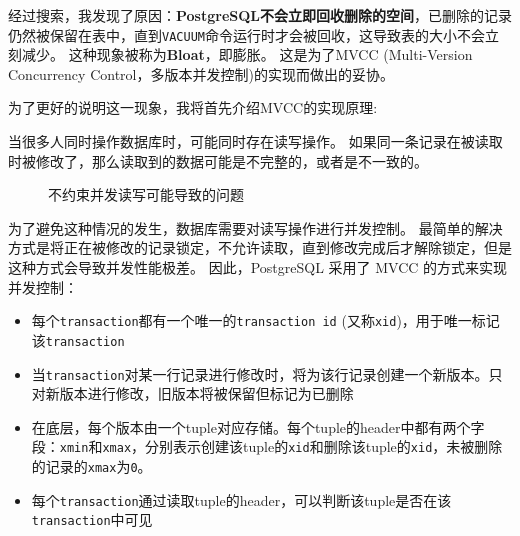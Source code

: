 \documentclass[a4paper,10pt]{ctexart}
\begin{document}
经过搜索，我发现了原因：\textbf{PostgreSQL不会立即回收删除的空间}，已删除的记录仍然被保留在表中，直到\texttt{VACUUM}命令运行时才会被回收，这导致表的大小不会立刻减少。
这种现象被称为\textbf{Bloat}，即膨胀。
这是为了MVCC (Multi-Version Concurrency Control，多版本并发控制)的实现而做出的妥协。

\vspace{0.7cm}
为了更好的说明这一现象，我将首先介绍MVCC的实现原理:

当很多人同时操作数据库时，可能同时存在读写操作。
如果同一条记录在被读取时被修改了，那么读取到的数据可能是不完整的，或者是不一致的。
\begin{figure}[H]
    \centering
    \caption{不约束并发读写可能导致的问题}
\end{figure}

为了避免这种情况的发生，数据库需要对读写操作进行并发控制。
最简单的解决方式是将正在被修改的记录锁定，不允许读取，直到修改完成后才解除锁定，但是这种方式会导致并发性能极差。
因此，PostgreSQL 采用了 MVCC 的方式来实现并发控制：
\begin{itemize}
    \item 每个\texttt{transaction}都有一个唯一的\texttt{transaction id} (又称\texttt{xid})，用于唯一标记该\texttt{transaction}
    \item 当\texttt{transaction}对某一行记录进行修改时，将为该行记录创建一个新版本。只对新版本进行修改，旧版本将被保留但标记为已删除
    \item 在底层，每个版本由一个tuple对应存储。每个tuple的header中都有两个字段：\texttt{xmin}和\texttt{xmax}，分别表示创建该tuple的\texttt{xid}和删除该tuple的\texttt{xid}，未被删除的记录的\texttt{xmax}为\texttt{0}。
    \item 每个\texttt{transaction}通过读取tuple的header，可以判断该tuple是否在该\texttt{transaction}中可见
\end{itemize}
\end{document}
